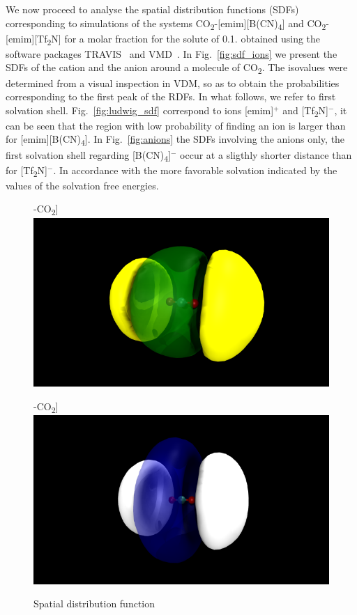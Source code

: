 \documentclass[3p,twocolumn]{elsarticle}
\begin{document}
We now proceed to analyse the spatial distribution functions (SDFs)\cite{Svishchev_1993} corresponding to simulations of the systems CO\textsubscript{2}-[emim][B(CN)\textsubscript{4}] and CO\textsubscript{2}-[emim][Tf\textsubscript{2}N] for a molar fraction for the solute of 0.1. obtained using the software packages TRAVIS~\cite{Brehm_2011} and VMD~\cite{HUMP96}. In Fig.~\ref{fig:sdf_ions} we present the SDFs of the cation and the anion around a molecule of CO\textsubscript{2}. The isovalues were determined from a visual inspection in VDM, so as to obtain the probabilities corresponding to the first peak of the RDFs. In what follows, we refer to first solvation shell. Fig.~\ref{fig:ludwig_sdf} correspond to ions [emim]$^{+}$ and [Tf\textsubscript{2}N]$^{-}$, it can be seen that the region with low probability of finding an ion is larger than for [emim][B(CN)\textsubscript{4}]. In Fig.~\ref{fig:anions} the SDFs involving the anions only, the first solvation shell regarding [B(CN)\textsubscript{4}]$^{-}$ occur at a sligthly shorter distance than for [Tf\textsubscript{2}N]$^{-}$. In accordance with the more favorable solvation indicated by the values of the solvation free energies.

\begin{figure}
\centering
\subfloat[[emim][BCN4]-CO\textsubscript{2}]{%
  \includegraphics[width=\linewidth]{kollerall.pdf}%
}

\subfloat[[emim][BCN4]-CO\textsubscript{2}]{%
  \includegraphics[width=\linewidth]{ludwigall.pdf}%
}
\caption{Spatial distribution function}
\label{fig:sdf}
\end{figure}
\end{document}
